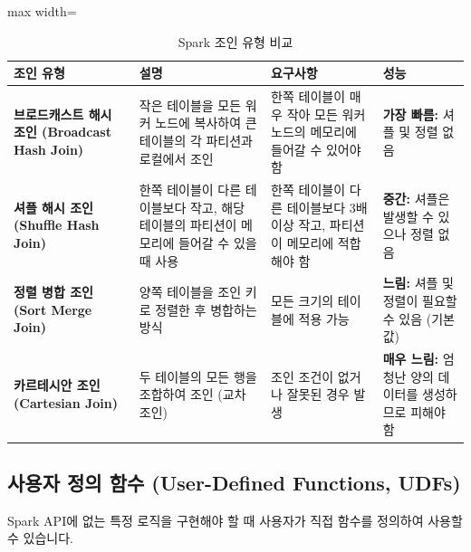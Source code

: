 \documentclass[11pt,a4paper]{article}
\begin{document}
\begin{table}[h!]
\centering
\caption{Spark 조인 유형 비교}
\label{tab:spark_join_types}
\begin{adjustbox}{max width=\textwidth}
\begin{tabular}{p{}p{}p{}p{}}
\toprule
\textbf{조인 유형} & \textbf{설명} & \textbf{요구사항} & \textbf{성능} \\
\midrule
\textbf{브로드캐스트 해시 조인 (Broadcast Hash Join)} & 작은 테이블을 모든 워커 노드에 복사하여 큰 테이블의 각 파티션과 로컬에서 조인 & 한쪽 테이블이 매우 작아 모든 워커 노드의 메모리에 들어갈 수 있어야 함 & \textbf{가장 빠름:} 셔플 및 정렬 없음 \\
\textbf{셔플 해시 조인 (Shuffle Hash Join)} & 한쪽 테이블이 다른 테이블보다 작고, 해당 테이블의 파티션이 메모리에 들어갈 수 있을 때 사용 & 한쪽 테이블이 다른 테이블보다 3배 이상 작고, 파티션이 메모리에 적합해야 함 & \textbf{중간:} 셔플은 발생할 수 있으나 정렬 없음 \\
\textbf{정렬 병합 조인 (Sort Merge Join)} & 양쪽 테이블을 조인 키로 정렬한 후 병합하는 방식 & 모든 크기의 테이블에 적용 가능 & \textbf{느림:} 셔플 및 정렬이 필요할 수 있음 (기본값) \\
\textbf{카르테시안 조인 (Cartesian Join)} & 두 테이블의 모든 행을 조합하여 조인 (교차 조인) & 조인 조건이 없거나 잘못된 경우 발생 & \textbf{매우 느림:} 엄청난 양의 데이터를 생성하므로 피해야 함 \\
\bottomrule
\end{tabular}
\end{adjustbox}
\end{table}

\subsection{사용자 정의 함수 (User-Defined Functions, UDFs)}
Spark API에 없는 특정 로직을 구현해야 할 때 사용자가 직접 함수를 정의하여 사용할 수 있습니다.
\end{document}
